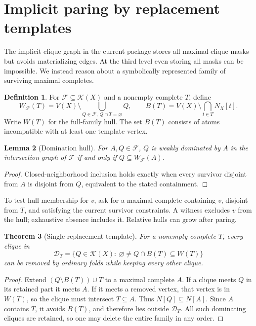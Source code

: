 \documentclass[11pt,a4paper]{article}
\newtheorem{theorem}{Theorem}[section]
\newtheorem{lemma}[theorem]{Lemma}
\theoremstyle{definition}\newtheorem{definition}[theorem]{Definition}\newtheorem{example}[theorem]{Example}
\theoremstyle{remark}\newtheorem{remark}[theorem]{Remark}
\newcommand{\cl}{\mathcal K}
\newcommand{\D}{\mathcal D}
\begin{document}
\section{Implicit paring by replacement templates}\label{sec:paring}
The implicit clique graph in the current package stores all maximal-clique masks but avoids materializing edges. At the third level even storing all masks can be impossible. We instead reason about a symbolically represented family of surviving maximal completes.
\begin{definition}
For \(\mathcal F\subseteq\cl(X)\) and a nonempty complete \(T\), define
\[
 W_{\mathcal F}(T)=V(X)\setminus\bigcup_{Q\in\mathcal F,\ Q\cap T=\varnothing}Q,
 \qquad B(T)=V(X)\setminus\bigcap_{t\in T}N_X[t].
\]
Write \(W(T)\) for the full-family hull. The set \(B(T)\) consists of atoms incompatible with at least one template vertex.
\end{definition}
\begin{lemma}[Domination hull]
For \(A,Q\in\mathcal F\), \(Q\) is weakly dominated by \(A\) in the intersection graph of \(\mathcal F\) if and only if \(Q\subseteq W_{\mathcal F}(A)\).
\end{lemma}
\begin{proof}
Closed-neighborhood inclusion holds exactly when every survivor disjoint from \(A\) is disjoint from \(Q\), equivalent to the stated containment.
\end{proof}
To test hull membership for \(v\), ask for a maximal complete containing \(v\), disjoint from \(T\), and satisfying the current survivor constraints. A witness excludes \(v\) from the hull; exhaustive absence includes it. Relative hulls can grow after paring.
\begin{theorem}[Single replacement template]\label{thm:single}
For a nonempty complete \(T\), every clique in
\[
 \D_T=\{Q\in\cl(X):\ \varnothing\ne Q\cap B(T)\subseteq W(T)\}
\]
can be removed by ordinary folds while keeping every other clique.
\end{theorem}
\begin{proof}
Extend \((Q\setminus B(T))\cup T\) to a maximal complete \(A\). If a clique meets \(Q\) in its retained part it meets \(A\). If it meets a removed vertex, that vertex is in \(W(T)\), so the clique must intersect \(T\subseteq A\). Thus \(N[Q]\subseteq N[A]\). Since \(A\) contains \(T\), it avoids \(B(T)\), and therefore lies outside \(\D_T\). All such dominating cliques are retained, so one may delete the entire family in any order.
\end{proof}
\end{document}
